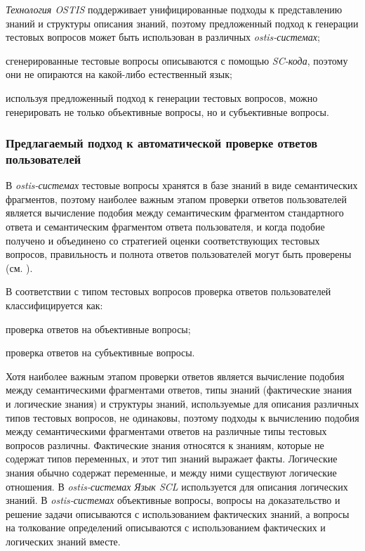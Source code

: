\begin{textitemize}
	\item \textit{Технология OSTIS} поддерживает унифицированные подходы к представлению знаний и структуры описания знаний, поэтому предложенный подход к генерации тестовых вопросов может быть использован в различных \textit{ostis-системах};
	\item сгенерированные тестовые вопросы описываются с помощью \textit{SC-кода}, поэтому они не опираются на какой-либо естественный язык;
	\item используя предложенный подход к генерации тестовых вопросов, можно генерировать не только объективные вопросы, но и субъективные вопросы.
\end{textitemize}

\subsubsection{Предлагаемый подход к автоматической проверке ответов пользователей}
\label{subsubsec_suggested_approach_automated_checking_user_responses}

В \textit{ostis-системах} тестовые вопросы хранятся в базе знаний в виде семантических фрагментов, поэтому наиболее важным этапом проверки ответов пользователей является вычисление подобия между семантическим фрагментом стандартного ответа и семантическим фрагментом ответа пользователя, и когда подобие получено и объединено со стратегией оценки соответствующих тестовых вопросов, правильность и полнота ответов пользователей могут быть проверены (см. ).

В соответствии с типом тестовых вопросов проверка ответов пользователей классифицируется как:

\begin{textitemize}
	\item проверка ответов на объективные вопросы;
	\item проверка ответов на субъективные вопросы.
\end{textitemize}

Хотя наиболее важным этапом проверки ответов является вычисление подобия между семантическими фрагментами ответов, типы знаний (фактические знания и логические знания) и структуры знаний, используемые для описания различных типов тестовых вопросов, не одинаковы, поэтому подходы к вычислению подобия между семантическими фрагментами ответов на различные типы тестовых вопросов различны. Фактические знания относятся к знаниям, которые не содержат типов переменных, и этот тип знаний выражает факты. Логические знания обычно содержат переменные, и между ними существуют логические отношения. В \textit{ostis-системах} \textit{Язык SCL} используется для описания логических знаний. В \textit{ostis-системах} объективные вопросы, вопросы на доказательство и решение задачи описываются с использованием фактических знаний, а вопросы на толкование определений описываются с использованием фактических и логических знаний вместе.

